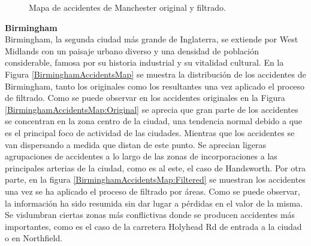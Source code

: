 \documentclass{uathesis-es}
\begin{document}
{\begin{figure}[H]
{				\label{ManchesterAccidentsMap:Filtered}
			}
			\caption{Mapa de accidentes de Manchester original y filtrado.}
			\label{ManchesterAccidentsMap}
		\end{figure}
		
		\textbf{Birmingham}\\
		
		Birmingham, la segunda ciudad más grande de Inglaterra, se extiende por West Midlands con un paisaje urbano diverso y una densidad de población considerable, famosa por su historia industrial y su vitalidad cultural. En la Figura \ref{BirminghamAccidentsMap} se muestra la distribución de los accidentes de Birmingham, tanto los originales como los resultantes una vez aplicado el proceso de filtrado. Como se puede observar en los accidentes originales en la Figura \ref{BirminghamAccidentsMap:Original} se aprecia que gran parte de los accidentes se concentran en la zona centro de la ciudad, una  tendencia normal debido a que es el principal foco de actividad de las ciudades. Mientras que los accidentes se van dispersando a medida que distan de este punto. Se aprecian ligeras agrupaciones de accidentes a lo largo de las zonas de incorporaciones a las principales arterias de la ciudad, como es al este, el caso de Handsworth. Por otra parte, en la figura \ref{BirminghamAccidentsMap:Filtered} se muestran los accidentes una vez se ha aplicado el proceso de filtrado por áreas. Como se puede observar, la información ha sido resumida sin dar lugar a pérdidas en el valor de la misma. Se vislumbran ciertas zonas más conflictivas donde se producen accidentes más importantes, como es el caso de la carretera Holyhead Rd de entrada a la ciudad o en Northfield.
		
		
}
\end{document}
